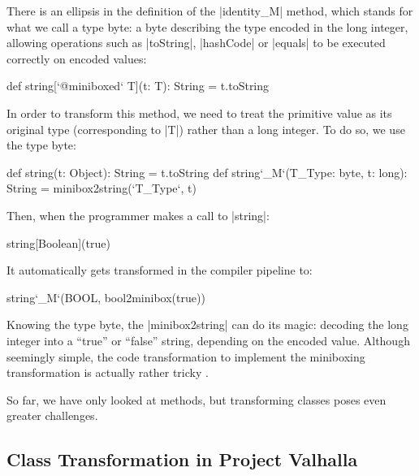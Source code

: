 There is an ellipsis in the definition of the |identity_M| method, which stands for what we call a type byte: a byte describing the type encoded in the long integer, allowing operations such as |toString|, |hashCode| or |equals| to be executed correctly on encoded values:

\begin{lstlisting-nobreak}
 def string[`@miniboxed` T](t: T): String = t.toString
\end{lstlisting-nobreak}

In order to transform this method, we need to treat the primitive value as its original type (corresponding to |T|) rather than a long integer. To do so, we use the type byte:

\begin{lstlisting-nobreak}
 def string(t: Object): String = t.toString
 def string`_M`(T_Type: byte, t: long): String =
                                       minibox2string(`T_Type`, t)
\end{lstlisting-nobreak}

Then, when the programmer makes a call to |string|:

\begin{lstlisting-nobreak}
 string[Boolean](true)
\end{lstlisting-nobreak}

It automatically gets transformed in the compiler pipeline to:

\begin{lstlisting-nobreak}
 string`_M`(BOOL, bool2minibox(true))
\end{lstlisting-nobreak}

Knowing the type byte, the |minibox2string| can do its magic: decoding the long integer into a ``true'' or ``false'' string, depending on the encoded value. Although seemingly simple, the code transformation to implement the miniboxing transformation is actually rather tricky \cite{miniboxing-linkedlist, ldl, ildl-tech}.

So far, we have only looked at methods, but transforming classes poses even greater challenges.

\vspace{-0.3em}

\subsection{Class Transformation in Project Valhalla}

\vspace{-0.3em}

